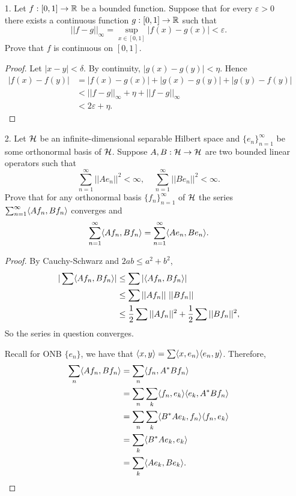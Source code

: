 
\begin{itemize}
\item[1.] Let $f:[0,1] \rightarrow \mathbb{R}$ be a bounded function. Suppose that for every $\varepsilon > 0$
there exists a continuous function $g:[0,1] \rightarrow \mathbb{R}$ such that
$$||f-g||_{\infty} = \sup_{x\in[0,1]} |f(x) - g(x)| < \varepsilon.$$
Prove that $f$ is continuous on $[0, 1]$.
 
\begin{proof}
Let $|x-y|<\delta$. By continuity, $|g(x) - g(y)| < \eta$.
Hence 
\begin{align*}
    |f(x) - f(y)| &= |f(x) - g(x)| + |g(x) - g(y)| + |g(y) - f(y)| \\
    &< ||f-g||_{\infty} + \eta + ||f-g||_{\infty} \\
    &< 2\varepsilon + \eta.
\end{align*}
\end{proof}





\item[2.] Let $\mathcal{H}$ be an infinite-dimensional separable Hilbert space and $\{e_n\}_{n=1}^{\infty}$
be some orthonormal basis of $\mathcal{H}$. Suppose $A, B :\mathcal{H} \rightarrow \mathcal{H}$ are two bounded linear operators
such that
$$\sum_{n=1}^{\infty} ||Ae_n||^2 < \infty, \ \ \ \ \ \sum_{n=1}^{\infty} ||Be_n||^2 < \infty.$$
Prove that for any orthonormal basis $\{f_n\}_{n=1}^{\infty}$ of $\mathcal{H}$ the series $\sum_{n=1}^{\infty} \langle{}Af_n,Bf_n\rangle$ converges and 
$$\sum_{n=1}^{\infty} \langle{}Af_n,Bf_n\rangle = \sum_{n=1}^{\infty} \langle{}Ae_n,Be_n\rangle.$$
\begin{proof}
By Cauchy-Schwarz and $2ab \leq a^2 + b^2$, 
\begin{align*}
    |\sum \langle{}Af_n,Bf_n\rangle| &\leq \sum |\langle{}Af_n,Bf_n\rangle| \\
    &\leq \sum ||Af_n|| \ ||Bf_n|| \\
    &\leq \frac{1}{2}\sum ||Af_n||^2 + \frac{1}{2}\sum ||Bf_n||^2 ,
\end{align*}
So the series in question converges. 

\medskip 

Recall for ONB $\{e_n\}$, we have that $\langle{}x,y\rangle = \sum \langle{}x,e_n\rangle \langle{}e_n,y\rangle$. Therefore, 
\begin{align*}
    \sum_n \langle{}Af_n,Bf_n\rangle &= \sum_n \langle{}f_n,A^*Bf_n\rangle \\
     &= \sum_n \sum_k \langle{}f_n,e_k\rangle \langle{}e_k,A^*Bf_n\rangle \\ 
     &= \sum_n \sum_k \langle{}B^*Ae_k,f_n\rangle \langle{}f_n,e_k\rangle \\
     &= \sum_k \langle{}B^*Ae_k,e_k\rangle \\
     &= \sum_k \langle{}Ae_k,Be_k\rangle.
\end{align*}
\end{proof}




\end{itemize}
